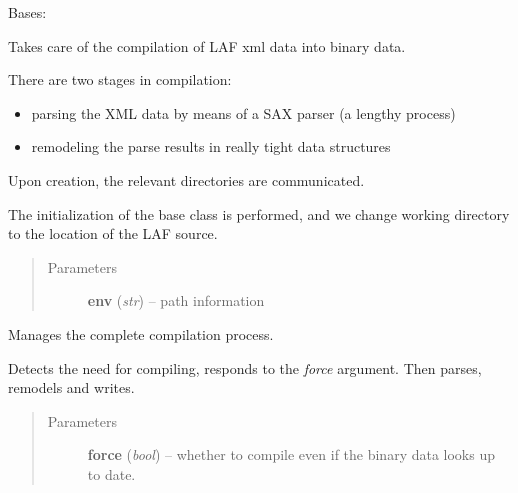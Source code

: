 \documentclass[letterpaper,10pt,english]{sphinxmanual}
\begin{document}
\begin{fulllineitems}
\label{graf/graf:graf.compiler.GrafCompiler}
Bases: {\hyperref[graf/graf:graf.graf.Graf]{}}

Takes care of the compilation of LAF xml data into binary data.

There are two stages in compilation:
\begin{itemize}
\item {} 
parsing the XML data by means of a SAX parser (a lengthy process)

\item {} 
remodeling the parse results in really tight data structures

\end{itemize}

Upon creation, the relevant directories are communicated.

The initialization of the base class is performed, and we change working directory to the location of the LAF source.
\begin{quote}\begin{description}
\item[{Parameters}] \leavevmode
\textbf{env} (\emph{str}) --
path information

\end{description}\end{quote}

\begin{fulllineitems}
\label{graf/graf:graf.compiler.GrafCompiler.compiler}
Manages the complete compilation process.

Detects the need for compiling, responds to the \emph{force} argument. Then parses, remodels and writes.
\begin{quote}\begin{description}
\item[{Parameters}] \leavevmode
\textbf{force} (\emph{bool}) --
whether to compile even if the binary data looks up to date.

\end{description}\end{quote}

\end{fulllineitems}



\end{fulllineitems}
\end{document}
